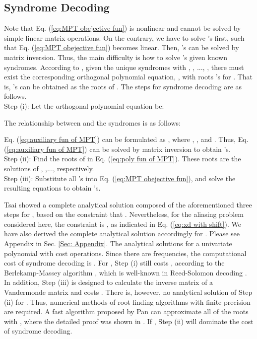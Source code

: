 \documentclass[journal,onecolumn,11pt]{IEEEtran}
\begin{document}
\subsection{Syndrome Decoding}\label{ssec:MPT}
Note that Eq. (\ref{eq:MPT obejective fun}) is nonlinear and cannot be solved by simple linear matrix operations.
On the contrary, we have to solve 's first, such that Eq. (\ref{eq:MPT obejective fun}) becomes linear.
Then, 's can be solved by matrix inversion.
Thus, the main difficulty is how to solve 's given known syndromes.
According to \cite{Szego1975}, given the unique syndromes with , , ..., , there must exist the corresponding orthogonal polynomial equation, , with roots 's for .
That is, 's can be obtained as the roots of .
The steps for syndrome decoding are as follows. \\
Step (i): Let the orthogonal polynomial equation  be:
\small

\normalsize
The relationship between  and the syndromes is as follows:
\small

\normalsize
Eq. (\ref{eq:auxiliary fun of MPT}) can be formulated as , where , , and .
Thus, Eq. (\ref{eq:auxiliary fun of MPT}) can be solved by matrix inversion  to obtain 's.\\
Step (ii): Find the roots of  in Eq. (\ref{eq:poly fun of MPT}).
These roots are the solutions of , ,..., respectively.\\
Step (iii): Substitute all 's into Eq. (\ref{eq:MPT obejective fun}), and solve the resulting equations to obtain 's.

Tsai \cite{Tsai1985} showed a complete analytical solution composed of the aforementioned three steps for , based on the constraint that .
Nevertheless, for the aliasing problem considered here, the constraint is , as indicated in Eq. (\ref{eq:xd with shift}).
We have also derived the complete analytical solution accordingly for .
Please see Appendix in Sec. \ref{Sec: Appendix}.
The analytical solutions for a univariate polynomial with  cost  operations.
Since there are  frequencies, the computational cost of syndrome decoding is .
For , Step (i) still costs , according to the Berlekamp-Massey algorithm \cite{Massey1963}, which is well-known in Reed-Solomon decoding \cite{MacWilliams11977}.
In addition, Step (iii) is designed to calculate the inverse matrix of a Vandermonde matrix and costs  \cite{NChen2008}.
There is, however, no analytical solution of Step (ii) for .
Thus, numerical methods of root finding algorithms with finite precision are required.
A fast algorithm proposed by Pan \cite{Pan2002} can approximate all of the roots with , where the detailed proof was shown in \cite{Ghazi2013}.
If , Step (ii) will dominate the cost of syndrome decoding.
\end{document}
